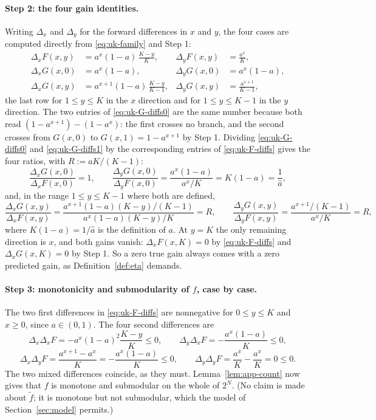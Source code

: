 \paragraph{Step 2: the four gain identities.}
Writing $\Delta_x$ and $\Delta_y$ for the forward differences in $x$ and $y$,
the four cases are computed directly from \eqref{eq:uk-family} and Step 1:
\begin{align}
  \Delta_xF(x,y)&=a^{x}(1-a)\,\frac{K-y}{K}, &
  \Delta_yF(x,y)&=\frac{a^{x}}{K},
  \label{eq:uk-F-diffs}\\
  \Delta_xG(x,0)&=a^{x}(1-a), &
  \Delta_yG(x,0)&=a^{x}(1-a),
  \label{eq:uk-G-diffs0}\\
  \Delta_xG(x,y)&=a^{x+1}(1-a)\,\frac{K-y}{K-1}, &
  \Delta_yG(x,y)&=\frac{a^{x+1}}{K-1},
  \label{eq:uk-G-diffs1}
\end{align}
the last row for $1\le y\le K$ in the $x$ direction and for
$1\le y\le K-1$ in the $y$ direction.  The two entries of
\eqref{eq:uk-G-diffs0} are the same number because both read
$(1-a^{x+1})-(1-a^{x})$: the first crosses no branch, and the second crosses
from $G(x,0)$ to $G(x,1)=1-a^{x+1}$ by Step 1.  Dividing
\eqref{eq:uk-G-diffs0} and \eqref{eq:uk-G-diffs1} by the corresponding entries
of \eqref{eq:uk-F-diffs} gives the four ratios, with $R:=aK/(K-1)$:
\[
  \frac{\Delta_xG(x,0)}{\Delta_xF(x,0)}=1,
  \qquad
  \frac{\Delta_yG(x,0)}{\Delta_yF(x,0)}
   =\frac{a^{x}(1-a)}{a^{x}/K}=K(1-a)=\frac1{\hat a},
\]
and, in the range $1\le y\le K-1$ where both are defined,
\[
  \frac{\Delta_xG(x,y)}{\Delta_xF(x,y)}
   =\frac{a^{x+1}(1-a)(K-y)/(K-1)}{a^{x}(1-a)(K-y)/K}=R,
  \qquad
  \frac{\Delta_yG(x,y)}{\Delta_yF(x,y)}
   =\frac{a^{x+1}/(K-1)}{a^{x}/K}=R,
\]
where $K(1-a)=1/\hat a$ is the definition of $a$.  At $y=K$ the only remaining
direction is $x$, and both gains vanish: $\Delta_xF(x,K)=0$ by
\eqref{eq:uk-F-diffs} and $\Delta_xG(x,K)=0$ by Step 1.  So a zero true gain
always comes with a zero predicted gain, as Definition~\ref{def:eta} demands.

\paragraph{Step 3: monotonicity and submodularity of $f$, case by case.}
The two first differences in \eqref{eq:uk-F-diffs} are nonnegative for
$0\le y\le K$ and $x\ge0$, since $a\in(0,1)$.  The four second differences are
\[
  \Delta_x\Delta_xF=-a^{x}(1-a)^{2}\frac{K-y}{K}\le0,\qquad
  \Delta_y\Delta_xF=-\frac{a^{x}(1-a)}{K}\le0,
\]
\[
  \Delta_x\Delta_yF=\frac{a^{x+1}-a^{x}}{K}=-\frac{a^{x}(1-a)}{K}\le0,\qquad
  \Delta_y\Delta_yF=\frac{a^{x}}{K}-\frac{a^{x}}{K}=0\le0 .
\]
The two mixed differences coincide, as they must.  Lemma~\ref{lem:app-count}
now gives that $f$ is monotone and submodular on the whole of $2^{N}$.  (No
claim is made about $\tilde f$; it is monotone but not submodular, which the
model of Section~\ref{sec:model} permits.)

